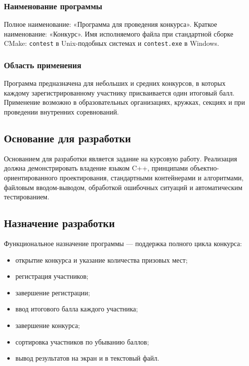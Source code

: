 \documentclass[14pt,a4paper]{extarticle}
\newcommand{\code}[1]{\texttt{#1}}
\begin{document}
\subsubsection{Наименование программы}

Полное наименование: «Программа для проведения конкурса». Краткое наименование: «Конкурс». Имя исполняемого файла при стандартной сборке CMake: \code{contest} в Unix-подобных системах и \code{contest.exe} в Windows.

\subsubsection{Область применения}

Программа предназначена для небольших и средних конкурсов, в которых каждому зарегистрированному участнику присваивается один итоговый балл. Применение возможно в образовательных организациях, кружках, секциях и при проведении внутренних соревнований.

\subsection{Основание для разработки}

Основанием для разработки является задание на курсовую работу. Реализация должна демонстрировать владение языком C++, принципами объектно-ориентированного проектирования, стандартными контейнерами и алгоритмами, файловым вводом-выводом, обработкой ошибочных ситуаций и автоматическим тестированием.

\subsection{Назначение разработки}

Функциональное назначение программы --- поддержка полного цикла конкурса:
\begin{itemize}
\item открытие конкурса и указание количества призовых мест;
\item регистрация участников;
\item завершение регистрации;
\item ввод итогового балла каждого участника;
\item завершение конкурса;
\item сортировка участников по убыванию баллов;
\item вывод результатов на экран и в текстовый файл.
\end{itemize}
\end{document}
